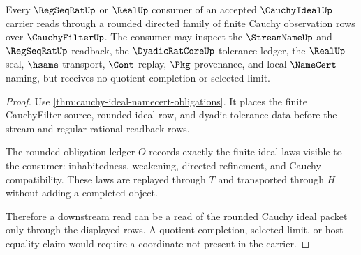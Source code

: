 \begin{theorem}
\label{thm:cauchy-ideal-rounded-readback}
Every $\RegSeqRatUp$ or $\RealUp$ consumer of an accepted $\CauchyIdealUp$ carrier reads through a rounded directed family of finite Cauchy observation rows over $\CauchyFilterUp$. The consumer may inspect the $\StreamNameUp$ and $\RegSeqRatUp$ readback, the $\DyadicRatCoreUp$ tolerance ledger, the $\RealUp$ seal, $\hsame$ transport, $\Cont$ replay, $\Pkg$ provenance, and local $\NameCert$ naming, but receives no quotient completion or selected limit.
\end{theorem}
\begin{proof}
Use \autoref{thm:cauchy-ideal-namecert-obligations}. It places the finite CauchyFilter source, rounded ideal row, and dyadic tolerance data before the stream and regular-rational readback rows.

The rounded-obligation ledger $O$ records exactly the finite ideal laws visible to the consumer: inhabitedness, weakening, directed refinement, and Cauchy compatibility. These laws are replayed through $T$ and transported through $H$ without adding a completed object.

Therefore a downstream read can be a read of the rounded Cauchy ideal packet only through the displayed rows. A quotient completion, selected limit, or host equality claim would require a coordinate not present in the carrier.
\end{proof}




